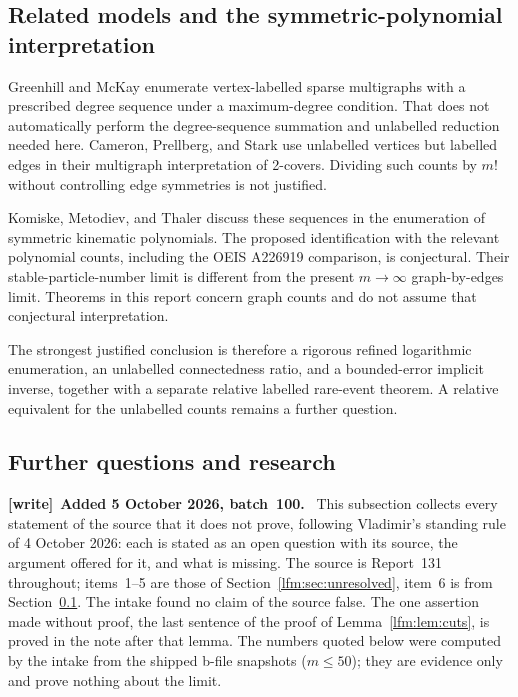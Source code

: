 \documentclass[11pt,letterpaper]{article}
\theoremstyle{remark}\newtheorem{remark}[theorem]{Remark}
\newenvironment{writenote}[1][]{\par\smallskip\begingroup\small
 \noindent\textbf{[write]}\if\relax\detokenize{#1}\relax\else~\textbf{#1.}\fi\ }%
 {\par\endgroup\smallskip}
\begin{document}
\subsection{Related models and the symmetric-polynomial interpretation}\label{lfm:sec:related}
Greenhill and McKay \cite{greenhill} enumerate vertex-labelled sparse multigraphs with a prescribed degree sequence under a maximum-degree condition. That does not automatically perform the degree-sequence summation and unlabelled reduction needed here. Cameron, Prellberg, and Stark \cite{cameron} use unlabelled vertices but labelled edges in their multigraph interpretation of 2-covers. Dividing such counts by $m!$ without controlling edge symmetries is not justified.

Komiske, Metodiev, and Thaler \cite{komiske} discuss these sequences in the enumeration of symmetric kinematic polynomials. The proposed identification with the relevant polynomial counts, including the OEIS A226919 comparison, is conjectural. Their stable-particle-number limit is different from the present $m\to\infty$ graph-by-edges limit. Theorems in this report concern graph counts and do not assume that conjectural interpretation.

The strongest justified conclusion is therefore a rigorous refined logarithmic enumeration, an unlabelled connectedness ratio, and a bounded-error implicit inverse, together with a separate relative labelled rare-event theorem. A relative equivalent for the unlabelled counts remains a further question.

\subsection{Further questions and research}\label{lfm:sec:further}
\begin{writenote}[Added 5 October 2026, batch~100]
This subsection collects every statement of the source that it does not
prove, following Vladimir's standing rule of 4 October 2026: each is stated
as an open question with its source, the argument offered for it, and what
is missing. The source is Report~131 throughout; items~1--5 are those of
Section~\ref{lfm:sec:unresolved}, item~6 is from
Section~\ref{lfm:sec:related}. The intake found no claim of the source
false. The one assertion made without proof, the last sentence of the proof
of Lemma~\ref{lfm:lem:cuts}, is proved in the note after that lemma. The
numbers quoted below were computed by the intake from the shipped b-file
snapshots ($m\le50$); they are evidence only and prove nothing about the
limit.
\end{writenote}
\end{document}
